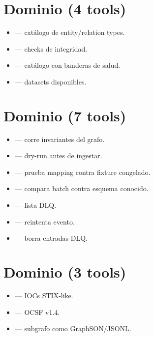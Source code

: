 \section{Dominio  (4 tools)}

\begin{itemize}
    \item {} — catálogo de entity/relation types.
    \item {} — checks de integridad.
    \item {} — catálogo con banderas de
    salud.
    \item {} — datasets disponibles.
\end{itemize}

\section{Dominio  (7 tools)}

\begin{itemize}
    \item {} — corre invariantes del grafo.
    \item {} — dry-run antes de
    ingestar.
    \item {} — prueba mapping contra
    fixture congelado.
    \item {} — compara batch contra esquema
    conocido.
    \item {} — lista DLQ.
    \item {} — reintenta evento.
    \item {} — borra entradas DLQ.
\end{itemize}

\section{Dominio  (3 tools)}

\begin{itemize}
    \item {} — IOCs STIX-like.
    \item {} — OCSF v1.4.
    \item {} — subgrafo como GraphSON/JSONL.
\end{itemize}

